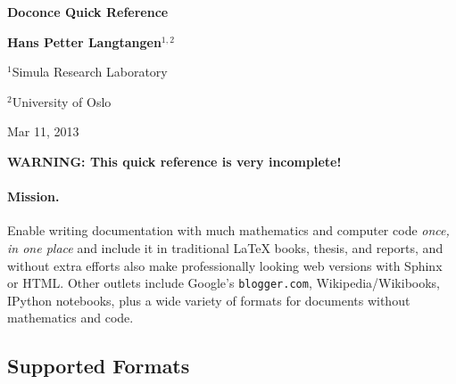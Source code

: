 \documentclass[%
oneside,                 %
final,                   %
10pt]{article}
\begin{document}




\begin{center}
{\LARGE\bf Doconce Quick Reference}
\end{center}



\begin{center}
{\bf Hans Petter Langtangen${}^{1, 2}$} \\ [0mm]
\end{center}

\begin{center}
\centerline{{\small ${}^1$Simula Research Laboratory}}
\centerline{{\small ${}^2$University of Oslo}}
\end{center}




\begin{center}
Mar 11, 2013
\end{center}

\vspace{1cm}



\tableofcontents

\vspace{1cm} %





\textbf{WARNING: This quick reference is very incomplete!}

\paragraph{Mission.}
Enable writing documentation with much mathematics and
computer code \emph{once, in one place} and include it in traditional {\LaTeX}
books, thesis, and reports, and without extra efforts also make
professionally looking web versions with Sphinx or HTML. Other outlets
include Google's \Verb!blogger.com!, Wikipedia/Wikibooks, IPython
notebooks, plus a wide variety of formats for documents without
mathematics and code.

\subsection{Supported Formats}
\end{document}
